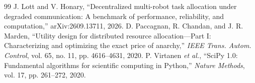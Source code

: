\documentclass[conference]{IEEEtran}
\begin{document}
\begin{thebibliography}{99}
 J. Lott and V. Honary, ``Decentralized multi-robot task allocation under degraded communication: A benchmark of performance, reliability, and computation,'' arXiv:2609.13711, 2026.
 D. Paccagnan, R. Chandan, and J. R. Marden, ``Utility design for distributed resource allocation---Part I: Characterizing and optimizing the exact price of anarchy,'' \emph{IEEE Trans. Autom. Control}, vol. 65, no. 11, pp. 4616--4631, 2020.
 P. Virtanen \emph{et al.}, ``SciPy 1.0: Fundamental algorithms for scientific computing in Python,'' \emph{Nature Methods}, vol. 17, pp. 261--272, 2020.
\end{thebibliography}
\end{document}
